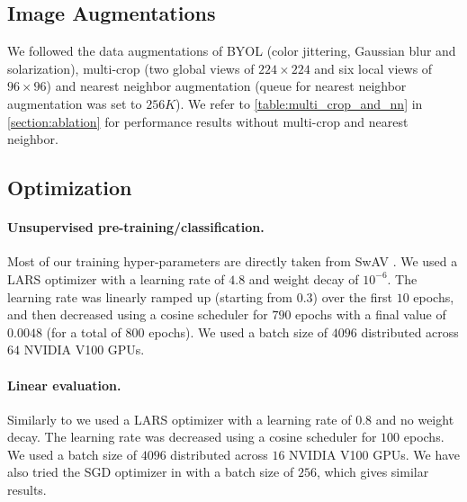 \documentclass[runningheads]{llncs}
\begin{document}
\subsection{Image Augmentations}
We followed the data augmentations of BYOL \cite{grill2020bootstrap} (color jittering, Gaussian blur and solarization), multi-crop \cite{caron2020unsupervised} (two global views of $224\times224$ and six local views of $96\times96$) and nearest neighbor augmentation \cite{Dwibedi_2021_ICCV} (queue for nearest neighbor augmentation was set to $256K$). We refer to \cref{table:multi_crop_and_nn} in \cref{section:ablation} for performance results without multi-crop and nearest neighbor. 

\subsection{Optimization}
\label{section:optimization}
\paragraph{Unsupervised pre-training/classification.} Most of our training hyper-parameters are directly taken from SwAV \cite{caron2020unsupervised}. We used a LARS optimizer \cite{you2017large} with a learning rate of $4.8$ and weight decay of $10^{-6}$. The learning rate was linearly ramped up (starting from $0.3$) over the first $10$ epochs, and then decreased using a cosine scheduler for $790$ epochs with a final value of $0.0048$ (for a total of $800$ epochs). We used a batch size of $4096$ distributed across $64$ NVIDIA V100 GPUs.

\paragraph{Linear evaluation.} Similarly to \cite{chen2021exploring} we used a LARS optimizer \cite{you2017large} with a learning rate of $0.8$ and no weight decay. The learning rate was decreased using a cosine scheduler for $100$ epochs. We used a batch size of $4096$ distributed across $16$ NVIDIA V100 GPUs. We have also tried the SGD optimizer in \cite{he2020momentum} with a batch size of $256$, which gives similar results.
\end{document}

